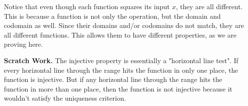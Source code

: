 \documentclass{amsart}
\theoremstyle{definition}
\theoremstyle{definition}
\theoremstyle{remark}
\begin{document}
Notice that even though each function squares its input $x$, they are all different. This is because a function is not only the operation, but the domain and codomain as well. Since their domains and/or codomains do not match, they are all different functions. This allows them to have different properties, as we are proving here.

\bigskip
\noindent \textbf{Scratch Work.} The injective property is essentially a "horizontal line test". If every horizontal line through the range hits the function in only one place, the function is injective. But if any horizontal line through the range hits the function in more than one place, then the function is not injective because it wouldn't satisfy the uniqueness criterion.

\begin{center}
\begin{tabular}{c c c}


\end{tabular}
\end{center}
\end{document}
